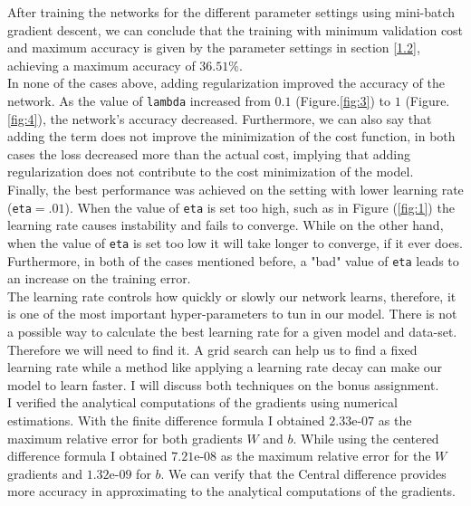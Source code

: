 \documentclass[11pt]{article}
\begin{document}
After training the networks for the different  parameter settings using mini-batch gradient descent, we can conclude that the training with minimum validation cost and maximum accuracy is given by the parameter settings in section  \ref{1.2}, achieving a maximum accuracy of  $36.51\%$. \\

In none of the cases above, adding regularization improved the accuracy of the network. As the value of \texttt{lambda} increased from $0.1$ (Figure.\ref{fig:3}) to $1$ (Figure.\ref{fig:4}), the network's accuracy decreased. Furthermore, we can also say that adding the term does not improve the minimization of the cost function, in both cases the loss decreased more than the actual cost, implying that adding regularization does not contribute to the cost minimization of the model. \\

Finally, the best performance was achieved on the setting with lower learning rate (\texttt{eta}$=.01$). When the value of \texttt{eta} is set too high, such as in Figure (\ref{fig:1}) the learning rate causes instability and fails to converge. While on the other hand, when the value of \texttt{eta} is set too low it will take longer to converge, if it ever does. Furthermore, in both of the cases mentioned before, a "bad" value of \texttt{eta} leads to an increase on the training error.\\

The learning rate controls how quickly or slowly our network learns, therefore, it is one of the most important hyper-parameters to tun in our model. There is not a possible way to calculate the best learning rate for a given model and data-set. Therefore we will need to find it. A grid search can help us to find a fixed learning rate while a method like applying a learning rate decay can make our model to learn faster. I will discuss both techniques on the bonus assignment.\\

I verified the analytical computations of the gradients using numerical estimations. With the finite difference formula I obtained $2.33\text{e-}07$ as the maximum relative error for both gradients $W$ and $b$. While using the centered difference formula I obtained $7.21\text{e-}08$ as the maximum relative error for the $W$ gradients and $1.32\text{e-}09$ for $b$. We can verify that the Central difference provides more accuracy in approximating to the analytical computations of the gradients.
\end{document}
